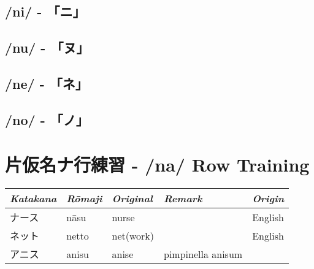 \subsection{/ni/ - 「ニ」} \label{sec:KatakanaNi}

 

\subsection{/nu/ - 「ヌ」} \label{sec:KatakanaNu}

 

\subsection{/ne/ - 「ネ」} \label{sec:KatakanaNe}

 

\subsection{/no/ - 「ノ」} \label{sec:KatakanaNo}

 

\section{片仮名ナ行練習 -  /na/ Row Training}
\Padding
\begin{longtable}[c]{p{2cm}p{2cm}p{3cm}p{6cm}p{2cm}}
\textit{Katakana}&\textit{Rōmaji}&\textit{Original}&\textit{Remark}&\textit{Origin}\\\hline
ナース  &nāsu &nurse      &                                        &English\\
ネット  &netto&net(work)  &                                        &English\\
アニス　&anisu&anise      &pimpinella anisum                       &\\
\end{longtable}

